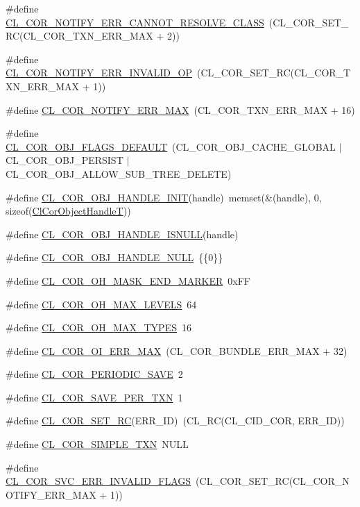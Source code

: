 \begin{CompactItemize}
\item 
\#define \hyperlink{group__group13_ga227}{CL\_\-COR\_\-NOTIFY\_\-ERR\_\-CANNOT\_\-RESOLVE\_\-CLASS}~(CL\_\-COR\_\-SET\_\-RC(CL\_\-COR\_\-TXN\_\-ERR\_\-MAX + 2))
\item 
\#define \hyperlink{group__group13_ga226}{CL\_\-COR\_\-NOTIFY\_\-ERR\_\-INVALID\_\-OP}~(CL\_\-COR\_\-SET\_\-RC(CL\_\-COR\_\-TXN\_\-ERR\_\-MAX + 1))
\item 
\#define \hyperlink{group__group13_ga228}{CL\_\-COR\_\-NOTIFY\_\-ERR\_\-MAX}~(CL\_\-COR\_\-TXN\_\-ERR\_\-MAX + 16)
\item 
\#define \hyperlink{group__group13_ga317}{CL\_\-COR\_\-OBJ\_\-FLAGS\_\-DEFAULT}~(CL\_\-COR\_\-OBJ\_\-CACHE\_\-GLOBAL $|$ CL\_\-COR\_\-OBJ\_\-PERSIST $|$ CL\_\-COR\_\-OBJ\_\-ALLOW\_\-SUB\_\-TREE\_\-DELETE)
\item 
\#define \hyperlink{group__group13_ga315}{CL\_\-COR\_\-OBJ\_\-HANDLE\_\-INIT}(handle)~memset(\&(handle), 0, sizeof(\hyperlink{struct_cl_cor_object_handle}{Cl\-Cor\-Object\-Handle\-T}))
\item 
\#define \hyperlink{group__group13_ga316}{CL\_\-COR\_\-OBJ\_\-HANDLE\_\-ISNULL}(handle)
\item 
\#define \hyperlink{group__group13_ga314}{CL\_\-COR\_\-OBJ\_\-HANDLE\_\-NULL}~\{\{0\}\}
\item 
\#define \hyperlink{group__group13_ga302}{CL\_\-COR\_\-OH\_\-MASK\_\-END\_\-MARKER}~0x\-FF
\item 
\#define \hyperlink{group__group13_ga301}{CL\_\-COR\_\-OH\_\-MAX\_\-LEVELS}~64
\item 
\#define \hyperlink{group__group13_ga300}{CL\_\-COR\_\-OH\_\-MAX\_\-TYPES}~16
\item 
\#define \hyperlink{group__group13_ga256}{CL\_\-COR\_\-OI\_\-ERR\_\-MAX}~(CL\_\-COR\_\-BUNDLE\_\-ERR\_\-MAX + 32)
\item 
\#define \hyperlink{group__group13_ga283}{CL\_\-COR\_\-PERIODIC\_\-SAVE}~2
\item 
\#define \hyperlink{group__group13_ga282}{CL\_\-COR\_\-SAVE\_\-PER\_\-TXN}~1
\item 
\#define \hyperlink{group__group13_ga145}{CL\_\-COR\_\-SET\_\-RC}(ERR\_\-ID)~(CL\_\-RC(CL\_\-CID\_\-COR, ERR\_\-ID))
\item 
\#define \hyperlink{group__group13_ga299}{CL\_\-COR\_\-SIMPLE\_\-TXN}~NULL
\item 
\#define \hyperlink{group__group13_ga229}{CL\_\-COR\_\-SVC\_\-ERR\_\-INVALID\_\-FLAGS}~(CL\_\-COR\_\-SET\_\-RC(CL\_\-COR\_\-NOTIFY\_\-ERR\_\-MAX + 1))
\item 

\end{CompactItemize}
